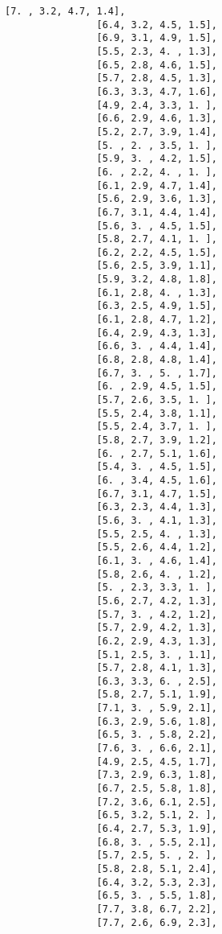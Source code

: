 \documentclass[11pt]{article}
\begin{document}
\begin{Verbatim}[commandchars=\\\{\}]
                [7. , 3.2, 4.7, 1.4],
                [6.4, 3.2, 4.5, 1.5],
                [6.9, 3.1, 4.9, 1.5],
                [5.5, 2.3, 4. , 1.3],
                [6.5, 2.8, 4.6, 1.5],
                [5.7, 2.8, 4.5, 1.3],
                [6.3, 3.3, 4.7, 1.6],
                [4.9, 2.4, 3.3, 1. ],
                [6.6, 2.9, 4.6, 1.3],
                [5.2, 2.7, 3.9, 1.4],
                [5. , 2. , 3.5, 1. ],
                [5.9, 3. , 4.2, 1.5],
                [6. , 2.2, 4. , 1. ],
                [6.1, 2.9, 4.7, 1.4],
                [5.6, 2.9, 3.6, 1.3],
                [6.7, 3.1, 4.4, 1.4],
                [5.6, 3. , 4.5, 1.5],
                [5.8, 2.7, 4.1, 1. ],
                [6.2, 2.2, 4.5, 1.5],
                [5.6, 2.5, 3.9, 1.1],
                [5.9, 3.2, 4.8, 1.8],
                [6.1, 2.8, 4. , 1.3],
                [6.3, 2.5, 4.9, 1.5],
                [6.1, 2.8, 4.7, 1.2],
                [6.4, 2.9, 4.3, 1.3],
                [6.6, 3. , 4.4, 1.4],
                [6.8, 2.8, 4.8, 1.4],
                [6.7, 3. , 5. , 1.7],
                [6. , 2.9, 4.5, 1.5],
                [5.7, 2.6, 3.5, 1. ],
                [5.5, 2.4, 3.8, 1.1],
                [5.5, 2.4, 3.7, 1. ],
                [5.8, 2.7, 3.9, 1.2],
                [6. , 2.7, 5.1, 1.6],
                [5.4, 3. , 4.5, 1.5],
                [6. , 3.4, 4.5, 1.6],
                [6.7, 3.1, 4.7, 1.5],
                [6.3, 2.3, 4.4, 1.3],
                [5.6, 3. , 4.1, 1.3],
                [5.5, 2.5, 4. , 1.3],
                [5.5, 2.6, 4.4, 1.2],
                [6.1, 3. , 4.6, 1.4],
                [5.8, 2.6, 4. , 1.2],
                [5. , 2.3, 3.3, 1. ],
                [5.6, 2.7, 4.2, 1.3],
                [5.7, 3. , 4.2, 1.2],
                [5.7, 2.9, 4.2, 1.3],
                [6.2, 2.9, 4.3, 1.3],
                [5.1, 2.5, 3. , 1.1],
                [5.7, 2.8, 4.1, 1.3],
                [6.3, 3.3, 6. , 2.5],
                [5.8, 2.7, 5.1, 1.9],
                [7.1, 3. , 5.9, 2.1],
                [6.3, 2.9, 5.6, 1.8],
                [6.5, 3. , 5.8, 2.2],
                [7.6, 3. , 6.6, 2.1],
                [4.9, 2.5, 4.5, 1.7],
                [7.3, 2.9, 6.3, 1.8],
                [6.7, 2.5, 5.8, 1.8],
                [7.2, 3.6, 6.1, 2.5],
                [6.5, 3.2, 5.1, 2. ],
                [6.4, 2.7, 5.3, 1.9],
                [6.8, 3. , 5.5, 2.1],
                [5.7, 2.5, 5. , 2. ],
                [5.8, 2.8, 5.1, 2.4],
                [6.4, 3.2, 5.3, 2.3],
                [6.5, 3. , 5.5, 1.8],
                [7.7, 3.8, 6.7, 2.2],
                [7.7, 2.6, 6.9, 2.3],

\end{Verbatim}
\end{document}
